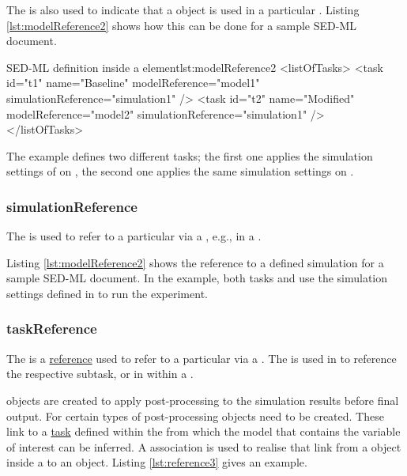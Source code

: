 The  is also used to indicate that a \Model object is used in a particular  \Task. Listing \ref{lst:modelReference2} shows how this can be done for a sample SED-ML document.

\begin{myXmlLst}{SED-ML  definition inside a  element}{lst:modelReference2}
<listOfTasks>
	<task id="t1" name="Baseline" modelReference="model1" simulationReference="simulation1" />
	<task id="t2" name="Modified" modelReference="model2" simulationReference="simulation1" />
</listOfTasks>
\end{myXmlLst}

The example defines two different tasks; the first one applies the simulation settings of  on , the second one applies the same simulation settings on .


\subsubsection{simulationReference}
\label{sec:simulationReference}
The  is used to refer to a particular \Simulation  via a \SIdRef, e.g., in a \Task. 

Listing \ref{lst:modelReference2} shows the reference to a defined simulation for a sample SED-ML document. In the example, both tasks  and  use the simulation settings defined in  to run the experiment.


\subsubsection{taskReference}
\label{sec:taskReference}
The  is a \hyperref[sec:reference]{reference} used to refer to a particular \AbstractTask via a \SIdRef. The  is used in \SubTask to reference the respective subtask, or in \Variable within a \DataGenerator.

\DataGenerator objects are created to apply post-processing to the simulation results before final output. 
For certain types of post-processing \Variable objects need to be created.
These link to a \hyperref[class:abstractTask]{task} defined within the \ListOfTasks from which the model that contains the variable of interest can be inferred. A  association is used to realise that link from a \Variable object inside a \DataGenerator to an \AbstractTask object. Listing \ref{lst:reference3} gives an example.

